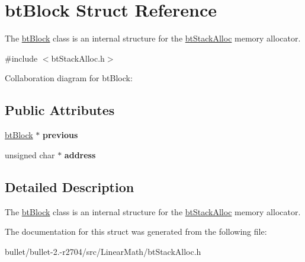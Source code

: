 \hypertarget{structbt_block}{\section{bt\+Block Struct Reference}
\label{structbt_block}
}


The \hyperlink{structbt_block}{bt\+Block} class is an internal structure for the \hyperlink{classbt_stack_alloc}{bt\+Stack\+Alloc} memory allocator.  




{\ttfamily \#include $<$bt\+Stack\+Alloc.\+h$>$}



Collaboration diagram for bt\+Block\+:
\subsection*{Public Attributes}
\begin{DoxyCompactItemize}
\item 
\hypertarget{structbt_block_a45d0a95855cf7603df58ff022dc3fd73}{\hyperlink{structbt_block}{bt\+Block} $\ast$ {\bfseries previous}}\label{structbt_block_a45d0a95855cf7603df58ff022dc3fd73}

\item 
\hypertarget{structbt_block_a0e165f15532695b7157a04e9471c8540}{unsigned char $\ast$ {\bfseries address}}\label{structbt_block_a0e165f15532695b7157a04e9471c8540}

\end{DoxyCompactItemize}


\subsection{Detailed Description}
The \hyperlink{structbt_block}{bt\+Block} class is an internal structure for the \hyperlink{classbt_stack_alloc}{bt\+Stack\+Alloc} memory allocator. 

The documentation for this struct was generated from the following file\+:\begin{DoxyCompactItemize}
\item 
bullet/bullet-\/2.-\/r2704/src/\+Linear\+Math/bt\+Stack\+Alloc.\+h\end{DoxyCompactItemize}
